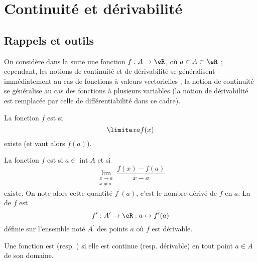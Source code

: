 \section{Continuité et dérivabilité}

\label{seccontetderiv}
\subsection{Rappels et outils}

On considère dans la suite une fonction $f : A \to \eR$, où $a \in A \subset \eR$ ; cependant, les notions de continuité et de dérivabilité se généralisent immédiatement au cas de fonctions à valeurs vectorielles ; la notion de continuité se généralise au cas des fonctions à plusieurs variables (la notion de dérivabilité est remplacée par celle de différentiabilité dans ce cadre).

\begin{definition}
    La fonction $f$ est  si
  \begin{equation*}
    \limite x a f(x)
  \end{equation*}
  existe (et vaut alors $f(a)$).
\end{definition}

\begin{definition}
    La fonction $f$ est  si $a \in
  \operatorname{int} A$ et si
  \begin{equation*}
    \lim_{\substack{x\rightarrow a\\x\neq a}} \frac{f(x)-f(a)}{x-a}
  \end{equation*}
  existe. On note alors cette quantité $f^\prime(a)$, c'est le nombre
  dérivé de $f$ en $a$. La  de $f$ est
  \begin{equation*}
    f^\prime : A^\prime \to \eR : a \mapsto f^\prime(a)
  \end{equation*}
  définie sur l'ensemble noté $A^\prime$ des points $a$ où $f$ est
  dérivable.
\end{definition}

\begin{definition}
  Une fonction est  (resp. ) si elle est continue (resp. dérivable) en tout point $a \in A$ de son domaine.
\end{definition}


